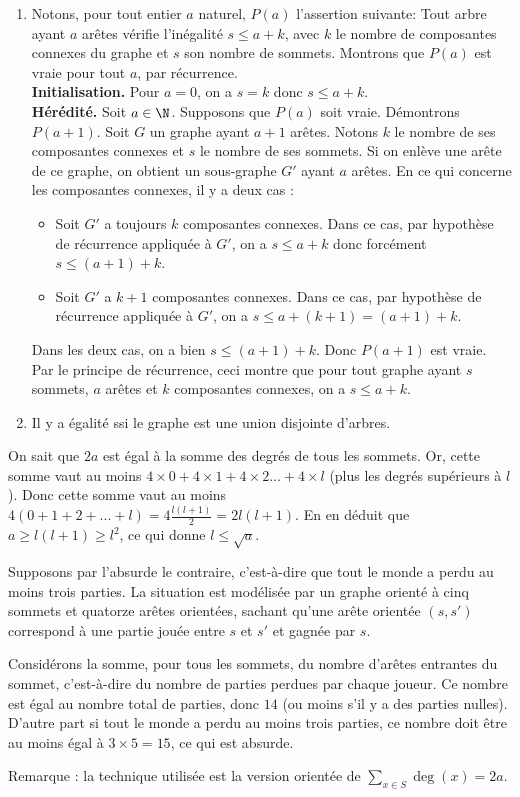 \begin{Soln}{92}
\begin{enumerate}
\item Notons, pour tout entier $a$ naturel, $P(a)$ l'assertion suivante: \og Tout arbre ayant $a$ arêtes vérifie l'inégalité $s \leq a+k$, avec $k$ le nombre de composantes connexes du graphe et $s$ son nombre de sommets.\fg{} Montrons que $P(a)$ est vraie pour tout $a$, par récurrence.\\
\textbf{Initialisation.} Pour $a=0$, on a $s=k$ donc $s\leq a+k$.\\
\textbf{Hérédité.} Soit $a\in \N$. Supposons que $P(a)$ soit vraie. Démontrons $P(a+1)$.  Soit $G$ un graphe ayant $a+1$ arêtes. Notons $k$ le nombre de ses composantes connexes et $s$ le nombre de ses sommets. Si on enlève une arête de ce graphe, on obtient un sous-graphe $G'$ ayant $a$ arêtes. En ce qui concerne les composantes connexes, il y a deux cas :
\begin{itemize}
\item Soit $G'$ a toujours $k$ composantes connexes. Dans ce cas, par hypothèse de récurrence appliquée à $G'$, on a  $s\leq a+k$ donc forcément  $s\leq (a+1)+k$.
\item Soit $G'$ a $k+1$ composantes connexes. Dans ce cas, par hypothèse de récurrence appliquée à $G'$, on a $s \leq a+ (k+1) = (a+1)+k$.
\end{itemize}
Dans les deux cas, on a bien $s\leq (a+1)+k$. Donc $P(a+1)$ est vraie.\\
Par le principe de récurrence, ceci montre que pour tout graphe ayant $s$ sommets, $a$ arêtes et $k$ composantes connexes, on a $s\leq a+k$.
\item Il y a égalité ssi le graphe est une union disjointe d'arbres.
\end{enumerate}
\end{Soln}
\begin{Soln}{93}
On sait que $2a$ est égal à la somme des degrés de tous les sommets. Or, cette somme vaut au moins $4\times0+4\times 1+4\times 2 ... + 4\times l$ (plus les degrés supérieurs à $l$). Donc cette somme vaut au moins $4(0+1+2+...+l) = 4\frac{l(l+1)}{2} = 2l(l+1)$. En en déduit que $a \geq l(l+1) \geq l^2$, ce qui donne $l\leq \sqrt a$.
\end{Soln}
\begin{Soln}{94}
Supposons par l'absurde le contraire, c'est-à-dire que tout le monde a perdu au moins trois parties. La situation est modélisée par un graphe orienté à cinq sommets et quatorze arêtes orientées, sachant qu'une arête orientée $(s,s')$ correspond à une partie jouée entre $s$ et $s'$ et gagnée par $s$.

Considérons la somme, pour tous les sommets, du nombre d'arêtes entrantes du sommet, c'est-à-dire du nombre de parties perdues par chaque joueur. Ce nombre est égal au nombre total de parties, donc $14$ (ou moins s'il y a des parties nulles). D'autre part si tout le monde a perdu au moins trois parties, ce nombre doit être au moins égal à $3\times 5=15$, ce qui est absurde.

Remarque : la technique utilisée est la version orientée de $\sum_{x\in S}\operatorname{deg}(x) = 2a$.
\end{Soln}
